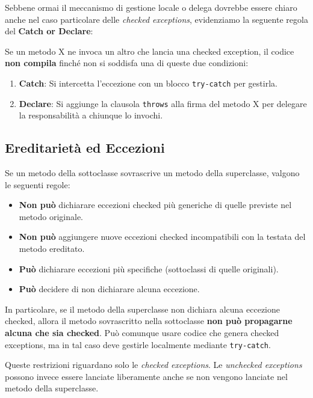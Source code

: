 Sebbene ormai il meccanismo di gestione locale o delega dovrebbe essere chiaro anche nel caso particolare delle \textit{checked exceptions}, evidenziamo la seguente regola del \textbf{Catch or Declare}:

\begin{tip}
Se un metodo X ne invoca un altro che lancia una checked exception, il codice \textbf{non compila} finché non si soddisfa una di queste due condizioni:
\begin{enumerate}
    \item \textbf{Catch}: Si intercetta l'eccezione con un blocco \texttt{try-catch} per gestirla.
    \item \textbf{Declare}: Si aggiunge la clausola \texttt{throws} alla firma del metodo X per delegare la responsabilità a chiunque lo invochi.
\end{enumerate}
\end{tip}

\subsection{Ereditarietà ed Eccezioni}

Se un metodo della sottoclasse sovrascrive un metodo della superclasse, valgono le seguenti regole:

\begin{itemize}
    \item \textbf{Non può} dichiarare eccezioni checked più generiche di quelle previste nel metodo originale.
    \item \textbf{Non può} aggiungere nuove eccezioni checked incompatibili con la testata del metodo ereditato.
    \item \textbf{Può} dichiarare eccezioni più specifiche (sottoclassi di quelle originali).
    \item \textbf{Può} decidere di non dichiarare alcuna eccezione.
\end{itemize}

In particolare, se il metodo della superclasse non dichiara alcuna eccezione checked, allora il metodo sovrascritto nella sottoclasse \textbf{non può propagarne alcuna che sia checked}. Può comunque usare codice che genera checked exceptions, ma in tal caso deve gestirle localmente mediante \texttt{try-catch}.

Queste restrizioni riguardano solo le \textit{checked exceptions}. Le \textit{unchecked exceptions} possono invece essere lanciate liberamente anche se non vengono lanciate nel metodo della superclasse.

